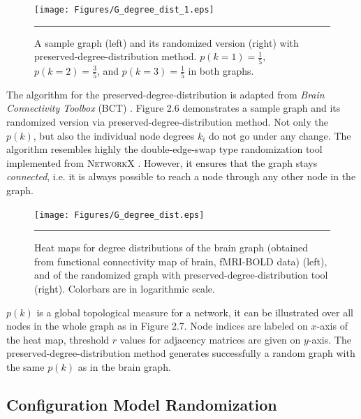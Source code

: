 \begin{figure}[htbp]
  \centering
	\texttt{[image: Figures/G\_degree\_dist\_1.eps]}  
    \rule{35em}{0.5pt}
  \caption[Degree Distribution 2D Example]{A sample graph (left) and its randomized version (right) with preserved-degree-distribution method. $p(k=1)=\frac{1}{5}$, $p(k=2)=\frac{3}{5}$, and $p(k=3)=\frac{1}{5}$ in both graphs. }
  \label{fig:Degree Distribution Example}
\end{figure}

The algorithm for the preserved-degree-distribution is adapted from \textit{Brain Connectivity Toolbox} (\textsc{BCT}) \citep{XYZBCT}. Figure 2.6 demonstrates a sample graph and its randomized version via preserved-degree-distribution method. Not only the $p(k)$, but also the individual node degrees $k_{i}$ do not go under any change.  The algorithm resembles highly the double-edge-swap type randomization tool implemented from \textsc{NetworkX} \citep{XYZNETW}. However, it ensures that the graph stays \textit{connected}, i.e. it is always possible to reach a node through any other node in the graph. 

\begin{figure}[htbp]
  \centering
	\texttt{[image: Figures/G\_degree\_dist.eps]}  
    \rule{35em}{0.5pt}
  \caption[Degree Distribution 3D Example]{Heat maps for degree distributions of the brain graph (obtained from functional connectivity map of brain, fMRI-BOLD data) (left), and of the randomized graph with preserved-degree-distribution tool (right). Colorbars are in logarithmic scale.}
  \label{fig:Degree Distribution 3D Example}
\end{figure}

$p(k)$ is a global topological measure for a network, it can be illustrated over all nodes in the whole graph as in Figure 2.7. Node indices are labeled on $x$-axis of the heat map, threshold $r$ values for adjacency matrices are given on $y$-axis. The preserved-degree-distribution method generates successfully a random graph with the same $p(k)$ as in the brain graph. 


\subsection{Configuration Model Randomization}

